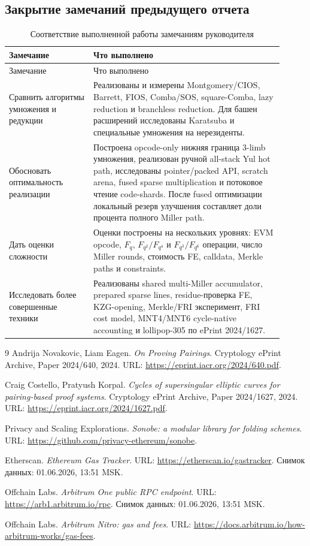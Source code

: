 \documentclass[12pt,a4paper]{article}
\begin{document}
\subsection{Закрытие замечаний предыдущего отчета}

\begin{longtable}{p{0.28\linewidth}p{0.63\linewidth}}
\caption{Соответствие выполненной работы замечаниям руководителя}\\
\toprule
Замечание & Что выполнено \\
\midrule
\endfirsthead
\toprule
Замечание & Что выполнено \\
\midrule
\endhead
Сравнить алгоритмы умножения и редукции &
Реализованы и измерены Montgomery/CIOS, Barrett, FIOS, Comba/SOS,
square-Comba, lazy reduction и branchless reduction. Для башен расширений
исследованы Karatsuba и специальные умножения на нерезиденты. \\
\addlinespace
Обосновать оптимальность реализации &
Построена opcode-only нижняя граница 3-limb умножения, реализован ручной
all-stack Yul hot path, исследованы pointer/packed API, scratch arena,
fused sparse multiplication и потоковое чтение code-shards. После fused
оптимизации локальный резерв улучшения составляет доли процента полного
Miller path. \\
\addlinespace
Дать оценки сложности &
Оценки построены на нескольких уровнях: EVM opcode, $F_q$,
$F_{q^2}/F_{q^4}$ и $F_{q^3}/F_{q^6}$ операции, число Miller rounds,
стоимость FE, calldata, Merkle paths и constraints.  \\
\addlinespace
Исследовать более совершенные техники &
Реализованы shared multi-Miller accumulator, prepared sparse lines,
residue-проверка FE, KZG-opening, Merkle/FRI эксперимент, FRI cost model, MNT4/MNT6 cycle-native accounting и lollipop-305 по ePrint 2024/1627. \\
\bottomrule
\end{longtable}

\begin{thebibliography}{9}
Andrija Novakovic, Liam Eagen.
\emph{On Proving Pairings}.
Cryptology ePrint Archive, Paper 2024/640, 2024.
URL: \url{https://eprint.iacr.org/2024/640.pdf}.

Craig Costello, Pratyush Korpal.
\emph{Cycles of supersingular elliptic curves for pairing-based proof systems}.
Cryptology ePrint Archive, Paper 2024/1627, 2024.
URL: \url{https://eprint.iacr.org/2024/1627.pdf}.

Privacy and Scaling Explorations.
\emph{Sonobe: a modular library for folding schemes}.
URL: \url{https://github.com/privacy-ethereum/sonobe}.

Etherscan.
\emph{Ethereum Gas Tracker}.
URL: \url{https://etherscan.io/gastracker}.
Снимок данных: 01.06.2026, 13:51 MSK.

Offchain Labs.
\emph{Arbitrum One public RPC endpoint}.
URL: \url{https://arb1.arbitrum.io/rpc}.
Снимок данных: 01.06.2026, 13:51 MSK.

Offchain Labs.
\emph{Arbitrum Nitro: gas and fees}.
URL: \url{https://docs.arbitrum.io/how-arbitrum-works/gas-fees}.
\end{thebibliography}
\end{document}

